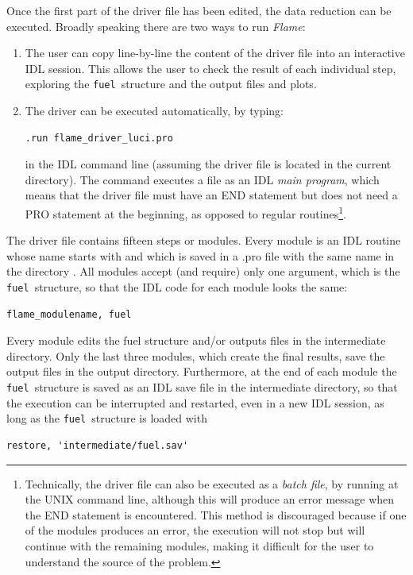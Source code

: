 \documentclass[a4paper]{article}
\newcommand{\flame}{\emph{Flame}}
\newcommand{\fuel}{\texttt{fuel}}
\begin{document}
\begin{sloppypar}
Once the first part of the driver file has been edited, the data reduction can be executed. Broadly speaking there are two ways to run \flame:
\begin{enumerate}
\item The user can copy line-by-line the content of the driver file into an interactive IDL session. This allows the user to check the result of each individual step, exploring the \fuel\ structure and the output files and plots.

\item The driver can be executed automatically, by typing:
\begin{lstlisting}
.run flame_driver_luci.pro
\end{lstlisting}
in the IDL command line (assuming the driver file is located in the current directory). The  command executes a file as an IDL \emph{main program}, which means that the driver file must have an END statement but does not need a PRO statement at the beginning, as opposed to regular routines\footnote{Technically, the driver file can also be executed as a \emph{batch file}, by running  at the UNIX command line, although this will produce an error message when the END statement is encountered. This method is discouraged because if one of the modules produces an error, the execution will not stop but will continue with the remaining modules, making it difficult for the user to understand the source of the problem.}.
\end{enumerate}

The driver file contains fifteen steps or modules. Every module is an IDL routine whose name starts with  and which is saved in a .pro file with the same name in the directory . All modules accept (and require) only one argument, which is the \fuel\ structure, so that the IDL code for each module looks the same:
\begin{lstlisting}
flame_modulename, fuel
\end{lstlisting}

Every module edits the fuel structure and/or outputs files in the intermediate directory. Only the last three modules, which create the final results, save the output files in the output directory. Furthermore, at the end of each module the \fuel\ structure is saved as an IDL save file in the intermediate directory, so that the execution can be interrupted and restarted, even in a new IDL session, as long as the \fuel\ structure is loaded with
\begin{lstlisting}
restore, 'intermediate/fuel.sav'
\end{lstlisting}


\end{sloppypar}
\end{document}
